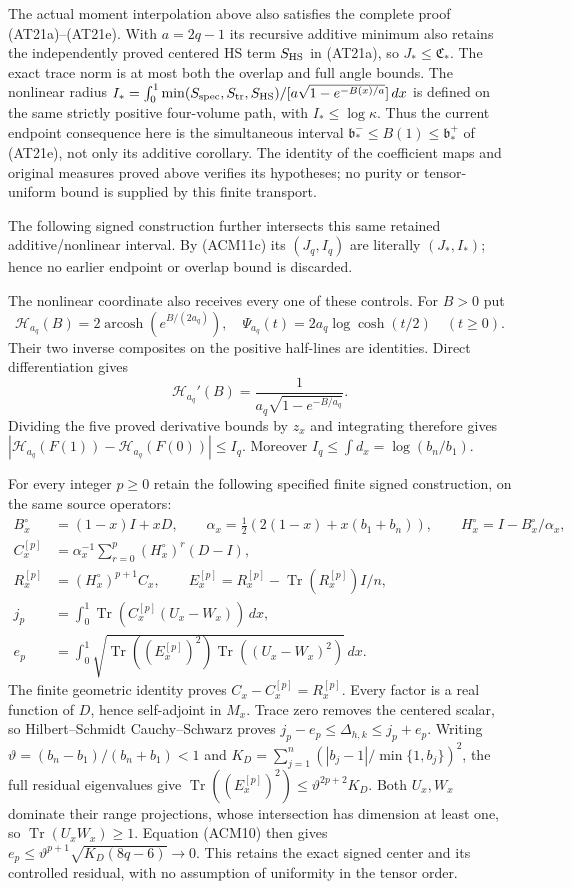 The actual moment interpolation above also satisfies the complete
proof (AT21a)--(AT21e). With $a=2q-1$ its recursive additive
minimum also retains the independently proved centered
HS term $S_{\rm HS}$ in (AT21a), so $J_*\le\mathfrak C_*$.
The exact trace
norm is at most both the overlap and full angle bounds. The
nonlinear radius
$I_*=\int_0^1\min(S_{\rm spec},S_{\rm tr},S_{\rm HS})/
[a\sqrt{1-e^{-B(x)/a}}]\,dx$
is defined on the same strictly positive four-volume path, with
$I_*\le\log\kappa$. Thus the current endpoint consequence here
is the simultaneous interval $\mathfrak b_*^-\le B(1)\le
\mathfrak b_*^+$ of (AT21e), not only its additive corollary.
The identity of the coefficient maps and original measures proved
above verifies its hypotheses; no purity or tensor-uniform bound
is supplied by this finite transport.

The following signed construction further intersects this same retained
additive/nonlinear interval. By (ACM11c) its $(J_q,I_q)$ are literally
$(J_*,I_*)$; hence no earlier endpoint or overlap bound is discarded.

The nonlinear coordinate also receives every one of these controls.
For $B>0$ put
\[
 \mathscr H_{a_q}(B)=2\operatorname{arcosh}(e^{B/(2a_q)}),\quad
 \Psi_{a_q}(t)=2a_q\log\cosh(t/2)\quad(t\geq0).
 \tag{ACM14}
\]
Their two inverse composites on the positive half-lines are identities.
Direct differentiation gives
\[
 \mathscr H_{a_q}'(B)=\frac{1}{a_q\sqrt{1-e^{-B/a_q}}}.
\]
Dividing the five proved derivative bounds
by $z_x$ and integrating therefore gives
$|\mathscr H_{a_q}(F(1))-\mathscr H_{a_q}(F(0))|\leq I_q$.
Moreover $I_q\leq\int d_x=\log(b_n/b_1)$.

For every integer $p\geq0$ retain the following specified finite
signed construction, on the same source operators:
\[
\begin{split}
 B_x^\circ&=(1-x)I+xD,\qquad
 \alpha_x=\tfrac12(2(1-x)+x(b_1+b_n)),\qquad
 H_x^\circ=I-B_x^\circ/\alpha_x,\\
 C_x^{[p]}&=\alpha_x^{-1}\sum_{r=0}^p(H_x^\circ)^r(D-I),\\
 R_x^{[p]}&=(H_x^\circ)^{p+1}C_x,
 \qquad E_x^{[p]}=R_x^{[p]}-\operatorname{Tr}(R_x^{[p]})I/n,\\
 j_p&=\int_0^1\operatorname{Tr}(C_x^{[p]}(U_x-W_x))\,dx,\\
 e_p&=\int_0^1\sqrt{\operatorname{Tr}((E_x^{[p]})^2)
                         \operatorname{Tr}((U_x-W_x)^2)}\,dx.
\end{split}
\tag{ACM15}
\]
The finite geometric identity proves $C_x-C_x^{[p]}=R_x^{[p]}$.
Every factor is a real function of $D$, hence self-adjoint in $M_x$.
Trace zero removes the centered scalar, so Hilbert--Schmidt
Cauchy--Schwarz proves $j_p-e_p\leq\Delta_{h,k}\leq j_p+e_p$.
Writing $\vartheta=(b_n-b_1)/(b_n+b_1)<1$ and
$K_D=\sum_{j=1}^n(|b_j-1|/\min\{1,b_j\})^2$, the full residual
eigenvalues give
$\operatorname{Tr}((E_x^{[p]})^2)\leq\vartheta^{2p+2}K_D$.
Both $U_x,W_x$ dominate their range projections, whose intersection
has dimension at least one, so $\operatorname{Tr}(U_xW_x)\geq1$.
Equation (ACM10) then gives
$e_p\leq\vartheta^{p+1}\sqrt{K_D(8q-6)}\to0$.
This retains the exact signed center and its controlled residual,
with no assumption of uniformity in the tensor order.

